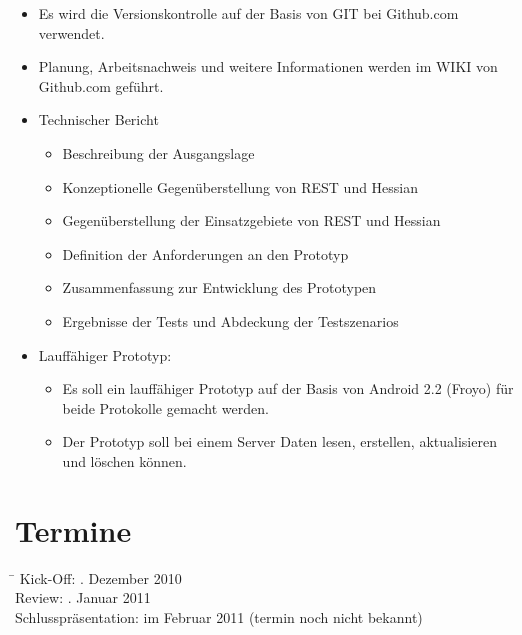 \documentclass[listof=totocnumbered, bibliography=totocnumbered]{scrreprt}
\begin{document}
  \begin{itemize}    
      \item Es wird die Versionskontrolle auf der Basis von GIT bei
          Github.com verwendet.
      \item Planung, Arbeitsnachweis und weitere Informationen werden im WIKI
          von Github.com geführt.
      \item Technischer Bericht
      \begin{itemize}
          \item Beschreibung der Ausgangslage
          \item Konzeptionelle Gegenüberstellung von REST und Hessian
          \item Gegenüberstellung der Einsatzgebiete von REST und Hessian
          \item Definition der Anforderungen an den Prototyp 
          \item Zusammenfassung zur Entwicklung des Prototypen
          \item Ergebnisse der Tests und Abdeckung der Testszenarios
          
      \end{itemize}
      \item Lauffähiger Prototyp:
      \begin{itemize}
          \item Es soll ein lauffähiger Prototyp auf der Basis von
              Android 2.2 (Froyo) für beide Protokolle gemacht werden.
           \item Der Prototyp soll bei einem Server Daten lesen, erstellen,
              aktualisieren und löschen können.
      \end{itemize}
  \end{itemize}
  
  \section{Termine}
  
  \begin{tabbing}
      \hspace*{4cm}\= \kill
    Kick-Off:               . Dezember 2010 \\
    Review:                 . Januar 2011 \\
    Schlusspräsentation:    \> im Februar 2011 (termin noch nicht bekannt)\\
  \end{tabbing}
  
\end{document}
